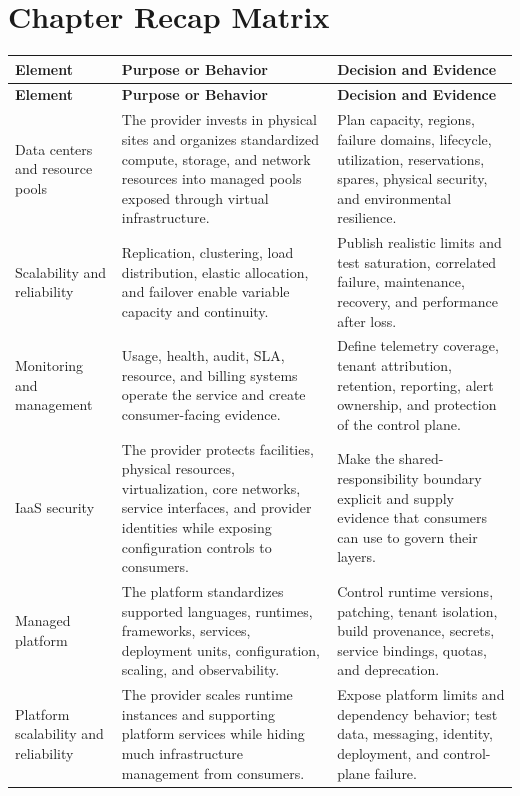 \documentclass[11pt]{article}
\begin{document}
\section{Chapter Recap Matrix}
\begingroup\small\setlength{\tabcolsep}{4pt}
\begin{longtable}{@{}>{\RaggedRight\arraybackslash}p{}>{\RaggedRight\arraybackslash}p{}>{\RaggedRight\arraybackslash}p{}@{}}
\toprule\rowcolor{Navy}\color{white}\textbf{Element} & \color{white}\textbf{Purpose or Behavior} & \color{white}\textbf{Decision and Evidence}\\\midrule\endfirsthead
\toprule\rowcolor{Navy}\color{white}\textbf{Element} & \color{white}\textbf{Purpose or Behavior} & \color{white}\textbf{Decision and Evidence}\\\midrule\endhead
Data centers and resource pools & The provider invests in physical sites and organizes standardized compute, storage, and network resources into managed pools exposed through virtual infrastructure. & Plan capacity, regions, failure domains, lifecycle, utilization, reservations, spares, physical security, and environmental resilience. \\\midrule
Scalability and reliability & Replication, clustering, load distribution, elastic allocation, and failover enable variable capacity and continuity. & Publish realistic limits and test saturation, correlated failure, maintenance, recovery, and performance after loss. \\\midrule
Monitoring and management & Usage, health, audit, SLA, resource, and billing systems operate the service and create consumer-facing evidence. & Define telemetry coverage, tenant attribution, retention, reporting, alert ownership, and protection of the control plane. \\\midrule
IaaS security & The provider protects facilities, physical resources, virtualization, core networks, service interfaces, and provider identities while exposing configuration controls to consumers. & Make the shared-responsibility boundary explicit and supply evidence that consumers can use to govern their layers. \\\midrule
Managed platform & The platform standardizes supported languages, runtimes, frameworks, services, deployment units, configuration, scaling, and observability. & Control runtime versions, patching, tenant isolation, build provenance, secrets, service bindings, quotas, and deprecation. \\\midrule
Platform scalability and reliability & The provider scales runtime instances and supporting platform services while hiding much infrastructure management from consumers. & Expose platform limits and dependency behavior; test data, messaging, identity, deployment, and control-plane failure. \\\midrule

\end{longtable}
\end{document}

